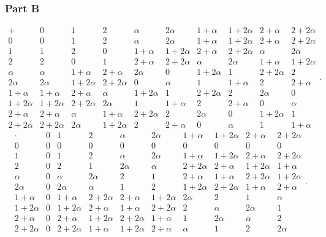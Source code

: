 \documentclass[12pt,titlepage]{extarticle}
\begin{document}
\subsubsection*{Part B}
\[
    \begin{array}{c|c|c|c|c|c|c|c|c|c}
        + & 0 & 1 & 2 & \alpha & 2 \alpha & 1+\alpha & 1+2 \alpha & 2+\alpha & 2+2 \alpha \\
        \hline 0 & 0 & 1 & 2 & \alpha & 2 \alpha & 1+\alpha & 1+2 \alpha & 2+\alpha & 2+2 \alpha \\
        \hline 1 & 1 & 2 & 0 & 1+\alpha & 1+2 \alpha & 2+\alpha & 2+2 \alpha & \alpha & 2 \alpha \\
        \hline 2 & 2 & 0 & 1 & 2+\alpha & 2+2 \alpha & \alpha & 2 \alpha & 1+\alpha & 1+2 \alpha \\
        \hline \alpha & \alpha & 1+\alpha & 2+\alpha & 2 \alpha & 0 & 1+2 \alpha & 1 & 2+2 \alpha & 2 \\
        \hline 2 \alpha & 2 \alpha & 1+2 \alpha & 2+2 \alpha & 0 & \alpha & 1 & 1+\alpha & 2 & 2+\alpha \\
        \hline 1+\alpha & 1+\alpha & 2+\alpha & \alpha & 1+2 \alpha & 1 & 2+2 \alpha & 2 & 2 \alpha & 0 \\
        \hline 1+2 \alpha & 1+2 \alpha & 2+2 \alpha & 2 \alpha & 1 & 1+\alpha & 2 & 2+\alpha & 0 & \alpha \\
        \hline 2+\alpha & 2+\alpha & \alpha & 1+\alpha & 2+2 \alpha & 2 & 2 \alpha & 0 & 1+2 \alpha & 1 \\
        \hline 2+2 \alpha & 2+2 \alpha & 2 \alpha & 1+2 \alpha & 2 & 2+\alpha & 0 & \alpha & 1 & 1+\alpha
    \end{array}
.\]
\vspace{5cm}
\[
    \begin{array}{c|c|c|c|c|c|c|c|c|c}
    \cdot & 0 & 1 & 2 & \alpha & 2 \alpha & 1+\alpha & 1+2 \alpha & 2+\alpha & 2+2 \alpha \\
    \hline 0 & 0 & 0 & 0 & 0 & 0 & 0 & 0 & 0 & 0 \\
    \hline 1 & 0 & 1 & 2 & \alpha & 2 \alpha & 1+\alpha & 1+2 \alpha & 2+\alpha & 2+2 \alpha \\
    \hline 2 & 0 & 2 & 1 & 2 \alpha & \alpha & 2+2 \alpha & 2+\alpha & 1+2 \alpha & 1+\alpha \\
    \hline \alpha & 0 & \alpha & 2 \alpha & 2 & 1 & 2+\alpha & 1+\alpha & 2+2 \alpha & 1+2 \alpha \\
    \hline 2 \alpha & 0 & 2 \alpha & \alpha & 1 & 2 & 1+2 \alpha & 2+2 \alpha & 1+\alpha & 2+\alpha \\
    \hline 1+\alpha & 0 & 1+\alpha & 2+2 \alpha & 2+\alpha & 1+2 \alpha & 2 \alpha & 2 & 1 & \alpha \\
    \hline 1+2 \alpha & 0 & 1+2 \alpha & 2+\alpha & 1+\alpha & 2+2 \alpha & 2 & \alpha & 2 \alpha & 1 \\
    \hline 2+\alpha & 0 & 2+\alpha & 1+2 \alpha & 2+2 \alpha & 1+\alpha & 1 & 2 \alpha & \alpha & 2 \\
    \hline 2+2 \alpha & 0 & 2+2 \alpha & 1+\alpha & 1+2 \alpha & 2+\alpha & \alpha & 1 & 2 & 2 \alpha
    \end{array}
.\]
\end{document}
